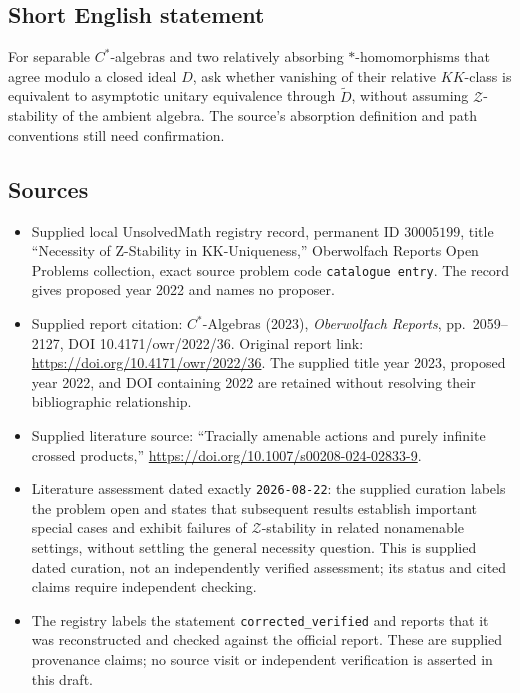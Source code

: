 \documentclass[11pt]{article}
\begin{document}
\subsection{Short English statement}
For separable \(C^*\)-algebras and two relatively absorbing \(*\)-homomorphisms that agree modulo a closed ideal \(D\), ask whether vanishing of their relative \(KK\)-class is equivalent to asymptotic unitary equivalence through \(\widetilde D\), without assuming \(\mathcal Z\)-stability of the ambient algebra. The source's absorption definition and path conventions still need confirmation.
\subsection{Sources}
\begin{itemize}
\item Supplied local UnsolvedMath registry record, permanent ID \(30005199\), title ``Necessity of Z-Stability in KK-Uniqueness,'' Oberwolfach Reports Open Problems collection, exact source problem code \texttt{catalogue entry}. The record gives proposed year 2022 and names no proposer.
\item Supplied report citation: \(C^*\)-Algebras (2023), \emph{Oberwolfach Reports}, pp.\ 2059--2127, DOI 10.4171/owr/2022/36. Original report link: \url{https://doi.org/10.4171/owr/2022/36}. The supplied title year 2023, proposed year 2022, and DOI containing 2022 are retained without resolving their bibliographic relationship.
\item Supplied literature source: ``Tracially amenable actions and purely infinite crossed products,'' \url{https://doi.org/10.1007/s00208-024-02833-9}.
\item Literature assessment dated exactly \texttt{2026-08-22}: the supplied curation labels the problem open and states that subsequent results establish important special cases and exhibit failures of \(\mathcal Z\)-stability in related nonamenable settings, without settling the general necessity question. This is supplied dated curation, not an independently verified assessment; its status and cited claims require independent checking.
\item The registry labels the statement \texttt{corrected\_verified} and reports that it was reconstructed and checked against the official report. These are supplied provenance claims; no source visit or independent verification is asserted in this draft.
\end{itemize}
\end{document}
